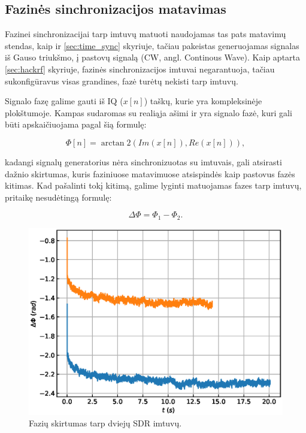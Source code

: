 \documentclass[main.tex]{subfiles}
\begin{document}
\subsection{Fazinės sinchronizacijos matavimas}

Fazinei sinchronizacijai tarp imtuvų matuoti naudojamas tas pats matavimų stendas,
kaip ir \ref{sec:time_sync} skyriuje, tačiau pakeistas generuojamas
signalas iš Gauso triukšmo, į pastovų signalą (CW, angl. Continous Wave).
Kaip aptarta \ref{sec:hackrf} skyriuje, fazinės sinchronizacijos
imtuvai negarantuoja, tačiau sukonfigūravus visas grandines,
fazė turėtų nekisti tarp imtuvų.

Signalo fazę galime gauti iš IQ ($x[n]$) taškų, kurie yra kompleksinėje plokštumoje. Kampas
sudaromas su realiąja ašimi ir yra signalo fazė, kuri gali būti apskaičiuojama pagal šią
formulę:

\begin{equation}
    \Phi[n] = \arctan2(Im(x[n]), Re(x[n])),
\end{equation}

\noindent kadangi signalų generatorius nėra sinchronizuotas su imtuvais, gali atsirasti
dažnio skirtumas, kuris faziniuose matavimuose atsispindės kaip pastovus fazės kitimas.
Kad pašalinti tokį kitimą, galime lyginti matuojamas fazes tarp imtuvų, pritaikę nesudėtingą
formulę:

\begin{equation}
    \Delta \Phi = \Phi_1 - \Phi_2.
\end{equation}

\begin{figure}[h]
    \begin{centering}
    \includegraphics[scale=1.0]{drawings/phase_sync}
    \par\end{centering}
    \protect\caption{\label{fig:phase_sync_result}Fazių skirtumas tarp dviejų SDR imtuvų.}
\end{figure}
\end{document}
